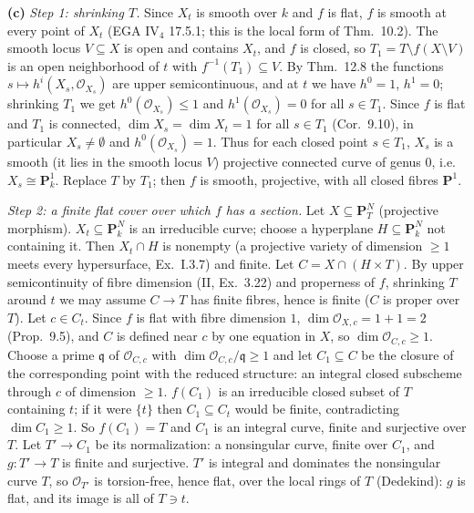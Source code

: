 \documentclass[11pt]{article}
\begin{document}
\textbf{(c)} \emph{Step 1: shrinking $T$.} Since $X_t$ is smooth over $k$ and $f$ is flat, $f$ is smooth at every point of $X_t$ (EGA IV$_4$ 17.5.1; this is the local form of Thm.~10.2). The smooth locus $V\subseteq X$ is open and contains $X_t$, and $f$ is closed, so $T_1=T\setminus f(X\setminus V)$ is an open neighborhood of $t$ with $f^{-1}(T_1)\subseteq V$. By Thm.~12.8 the functions $s\mapsto h^i(X_s,\mathcal O_{X_s})$ are upper semicontinuous, and at $t$ we have $h^0=1$, $h^1=0$; shrinking $T_1$ we get $h^0(\mathcal O_{X_s})\le1$ and $h^1(\mathcal O_{X_s})=0$ for all $s\in T_1$. Since $f$ is flat and $T_1$ is connected, $\dim X_s=\dim X_t=1$ for all $s\in T_1$ (Cor.~9.10), in particular $X_s\ne\emptyset$ and $h^0(\mathcal O_{X_s})=1$. Thus for each closed point $s\in T_1$, $X_s$ is a smooth (it lies in the smooth locus $V$) projective connected curve of genus $0$, i.e.\ $X_s\cong\mathbf P^1_k$. Replace $T$ by $T_1$; then $f$ is smooth, projective, with all closed fibres $\mathbf P^1$.

\emph{Step 2: a finite flat cover over which $f$ has a section.} Let $X\subseteq\mathbf P^N_T$ (projective morphism). $X_t\subseteq\mathbf P^N_k$ is an irreducible curve; choose a hyperplane $H\subseteq\mathbf P^N_k$ not containing it. Then $X_t\cap H$ is nonempty (a projective variety of dimension $\ge1$ meets every hypersurface, Ex.~I.3.7) and finite. Let $C=X\cap(H\times T)$. By upper semicontinuity of fibre dimension (II, Ex.~3.22) and properness of $f$, shrinking $T$ around $t$ we may assume $C\to T$ has finite fibres, hence is finite ($C$ is proper over $T$). Let $c\in C_t$. Since $f$ is flat with fibre dimension $1$, $\dim\mathcal O_{X,c}=1+1=2$ (Prop.~9.5), and $C$ is defined near $c$ by one equation in $X$, so $\dim\mathcal O_{C,c}\ge1$. Choose a prime $\mathfrak q$ of $\mathcal O_{C,c}$ with $\dim\mathcal O_{C,c}/\mathfrak q\ge1$ and let $C_1\subseteq C$ be the closure of the corresponding point with the reduced structure: an integral closed subscheme through $c$ of dimension $\ge1$. $f(C_1)$ is an irreducible closed subset of $T$ containing $t$; if it were $\{t\}$ then $C_1\subseteq C_t$ would be finite, contradicting $\dim C_1\ge1$. So $f(C_1)=T$ and $C_1$ is an integral curve, finite and surjective over $T$. Let $T'\to C_1$ be its normalization: a nonsingular curve, finite over $C_1$, and $g:T'\to T$ is finite and surjective. $T'$ is integral and dominates the nonsingular curve $T$, so $\mathcal O_{T'}$ is torsion-free, hence flat, over the local rings of $T$ (Dedekind): $g$ is flat, and its image is all of $T\ni t$.
\end{document}
